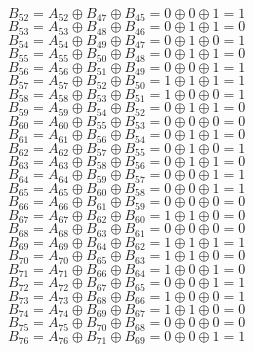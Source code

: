 $B_{52}=A_{52}\oplus B_{47}\oplus B_{45}=0\oplus 0\oplus 1=1$\\
$B_{53}=A_{53}\oplus B_{48}\oplus B_{46}=0\oplus 1\oplus 1=0$\\
$B_{54}=A_{54}\oplus B_{49}\oplus B_{47}=0\oplus 1\oplus 0=1$\\
$B_{55}=A_{55}\oplus B_{50}\oplus B_{48}=0\oplus 1\oplus 1=0$\\
$B_{56}=A_{56}\oplus B_{51}\oplus B_{49}=0\oplus 0\oplus 1=1$\\
$B_{57}=A_{57}\oplus B_{52}\oplus B_{50}=1\oplus 1\oplus 1=1$\\
$B_{58}=A_{58}\oplus B_{53}\oplus B_{51}=1\oplus 0\oplus 0=1$\\
$B_{59}=A_{59}\oplus B_{54}\oplus B_{52}=0\oplus 1\oplus 1=0$\\
$B_{60}=A_{60}\oplus B_{55}\oplus B_{53}=0\oplus 0\oplus 0=0$\\
$B_{61}=A_{61}\oplus B_{56}\oplus B_{54}=0\oplus 1\oplus 1=0$\\
$B_{62}=A_{62}\oplus B_{57}\oplus B_{55}=0\oplus 1\oplus 0=1$\\
$B_{63}=A_{63}\oplus B_{58}\oplus B_{56}=0\oplus 1\oplus 1=0$\\
$B_{64}=A_{64}\oplus B_{59}\oplus B_{57}=0\oplus 0\oplus 1=1$\\
$B_{65}=A_{65}\oplus B_{60}\oplus B_{58}=0\oplus 0\oplus 1=1$\\
$B_{66}=A_{66}\oplus B_{61}\oplus B_{59}=0\oplus 0\oplus 0=0$\\
$B_{67}=A_{67}\oplus B_{62}\oplus B_{60}=1\oplus 1\oplus 0=0$\\
$B_{68}=A_{68}\oplus B_{63}\oplus B_{61}=0\oplus 0\oplus 0=0$\\
$B_{69}=A_{69}\oplus B_{64}\oplus B_{62}=1\oplus 1\oplus 1=1$\\
$B_{70}=A_{70}\oplus B_{65}\oplus B_{63}=1\oplus 1\oplus 0=0$\\
$B_{71}=A_{71}\oplus B_{66}\oplus B_{64}=1\oplus 0\oplus 1=0$\\
$B_{72}=A_{72}\oplus B_{67}\oplus B_{65}=0\oplus 0\oplus 1=1$\\
$B_{73}=A_{73}\oplus B_{68}\oplus B_{66}=1\oplus 0\oplus 0=1$\\
$B_{74}=A_{74}\oplus B_{69}\oplus B_{67}=1\oplus 1\oplus 0=0$\\
$B_{75}=A_{75}\oplus B_{70}\oplus B_{68}=0\oplus 0\oplus 0=0$\\
$B_{76}=A_{76}\oplus B_{71}\oplus B_{69}=0\oplus 0\oplus 1=1$\\
